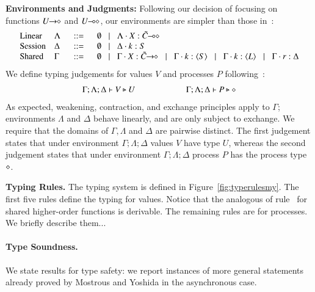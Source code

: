 {\bf Environments and Judgments:}
Following our decision of focusing on functions
$U\!\! \rightarrow\!\! \diamond$ and $U\!\! \multimap\!\! \diamond$, our environments are
simpler than those in~\cite{tlca07}:
%
\[
\begin{array}{llcl}
	\text{Linear} & \Lambda & \bnfis & \emptyset \bnfbar \Lambda \cat \varp{X}: \lhot{\tilde{C}}\\
	\text{Session} & \Delta & \bnfis & \emptyset \bnfbar \Delta \cat k:S \\
	\text{Shared} & \Gamma & \bnfis & \emptyset \bnfbar \Gamma \cat \varp{X}: \shot{\tilde{C}} \bnfbar \Gamma \cat k: \chtype{S} \bnfbar \Gamma \cat k: \chtype{L} \bnfbar \Gamma \cat r: \Delta
\end{array}
\]
%
\noi We define typing judgements for values $V$
and processes $P$ following~\cite{tlca07}:
%
\[	\begin{array}{c}
		\Gamma; \Lambda; \Delta \vdash V \triangleright U \qquad \qquad \qquad \Gamma; \Lambda; \Delta \vdash P \triangleright \diamond
	\end{array}
\]
%
\noi As expected, weakening, contraction, and exchange principles apply to $\Gamma$;
environments $\Lambda$ and $\Delta$ behave linearly, and are only subject to exchange.
We require that the domains of $\Gamma, \Lambda$ and $\Delta$ are pairwise distinct.
The first judgement states that under environment $\Gamma; \Lambda; \Delta$
values $V$ have type $U$,
whereas the second judgement states that under environment $\Gamma; \Lambda; \Delta$
process $P$ has the process type $\diamond$.

{\bf Typing Rules.}
The typing system is defined in Figure~\ref{fig:typerulesmy}. 
The first five rules define the typing for values. Notice that the analogous of rule~
for shared higher-order functions is derivable.
The remaining rules are for processes. We briefly describe them...



\paragraph{Type Soundness.}
We state results for type safety:
we report instances of more general statements already proved by
Mostrous and Yoshida in the asynchronous case.

